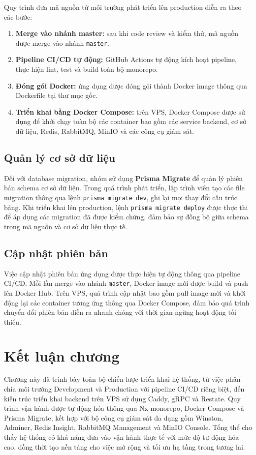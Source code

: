 Quy trình đưa mã nguồn từ môi trường phát triển lên production diễn ra theo các bước:

\begin{enumerate}
    \item \textbf{Merge vào nhánh master:} sau khi code review và kiểm thử, mã nguồn được merge vào nhánh \texttt{master}.
    \item \textbf{Pipeline CI/CD tự động:} GitHub Actions tự động kích hoạt pipeline, thực hiện lint, test và build toàn bộ monorepo.
    \item \textbf{Đóng gói Docker:} ứng dụng được đóng gói thành Docker image thông qua Dockerfile tại thư mục gốc.
    \item \textbf{Triển khai bằng Docker Compose:} trên VPS, Docker Compose được sử dụng để khởi chạy toàn bộ các container bao gồm các service backend, cơ sở dữ liệu, Redis, RabbitMQ, MinIO và các công cụ giám sát.
\end{enumerate}

\subsection{Quản lý cơ sở dữ liệu}

Đối với database migration, nhóm sử dụng \textbf{Prisma Migrate} \cite{prisma_docs} để quản lý phiên bản schema cơ sở dữ liệu. Trong quá trình phát triển, lập trình viên tạo các file migration thông qua lệnh \texttt{prisma migrate dev}, ghi lại mọi thay đổi cấu trúc bảng. Khi triển khai lên production, lệnh \texttt{prisma migrate deploy} được thực thi để áp dụng các migration đã được kiểm chứng, đảm bảo sự đồng bộ giữa schema trong mã nguồn và cơ sở dữ liệu thực tế.

\subsection{Cập nhật phiên bản}

Việc cập nhật phiên bản ứng dụng được thực hiện tự động thông qua pipeline CI/CD. Mỗi lần merge vào nhánh \texttt{master}, Docker image mới được build và push lên Docker Hub. Trên VPS, quá trình cập nhật bao gồm pull image mới và khởi động lại các container tương ứng thông qua Docker Compose, đảm bảo quá trình chuyển đổi phiên bản diễn ra nhanh chóng với thời gian ngừng hoạt động tối thiểu.

\section{Kết luận chương}
Chương này đã trình bày toàn bộ chiến lược triển khai hệ thống, từ việc phân chia môi trường Development và Production với pipeline CI/CD riêng biệt, đến kiến trúc triển khai backend trên VPS sử dụng Caddy, gRPC và Restate. Quy trình vận hành được tự động hóa thông qua Nx monorepo, Docker Compose và Prisma Migrate, kết hợp với bộ công cụ giám sát đa dạng gồm Winston, Adminer, Redis Insight, RabbitMQ Management và MinIO Console. Tổng thể cho thấy hệ thống có khả năng đưa vào vận hành thực tế với mức độ tự động hóa cao, đồng thời tạo nền tảng cho việc mở rộng và tối ưu hạ tầng trong tương lai.
